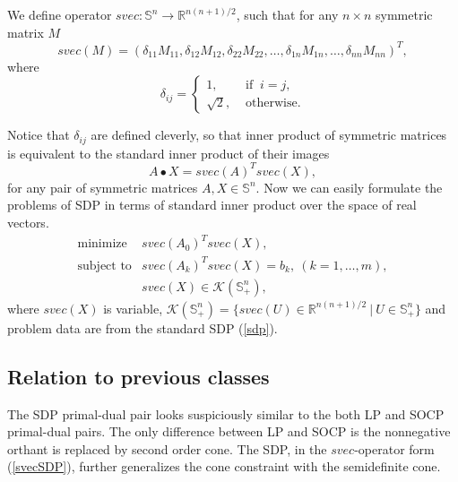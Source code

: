\documentclass[12pt]{book}
\theoremstyle{definition}
\begin{document}
 \label{svec}
We define operator $svec: \mathbb{S}^n \rightarrow \mathbb{R}^{n(n+1)/2}$, such that for any $n\times n$ symmetric matrix $M$
\begin{equation*}
	svec(M) = ( \delta_{11}M_{11},\delta_{12}M_{12},\delta_{22}M_{22},\dots ,\delta_{1n}M_{1n},\dots ,\delta_{nn}M_{nn})^T,
\end{equation*}
where
\begin{equation*}
	\delta_{ij}= \left\lbrace 
	\begin{array}{ll} 
		1, &\mbox{ if }\ i=j, \\ 
		\sqrt{2}, &\mbox{ otherwise.} 
	\end{array} \right.
\end{equation*}

Notice that $\delta_{ij}$ are defined cleverly, so that inner product of symmetric matrices is equivalent to the standard inner product of their images
\begin{equation*}
A\bullet X= svec(A)^Tsvec(X), 
\end{equation*}
for any pair of symmetric matrices $A,X\in \mathbb{S}^n.$  Now we can easily formulate the problems of SDP in terms of standard inner product over the space of real vectors. 
\begin{equation}
\label{svecSDP}
\begin{array}{ll}
\mbox{minimize} & svec(A_0)^T svec(X),\\
\mbox{subject to}& svec(A_k)^T svec(X)  = b_k, \ (k = 1,\dots ,m), \\
& svec(X) \in \mathcal{K}(\mathbb{S}^n_+),
\end{array}
\end{equation}
where $svec(X)$ is variable,  $\mathcal{K}(\mathbb{S}^n_+) = \{svec(U)\in \mathbb{R}^{n(n+1)/2}\ |\ U\in \mathbb{S}^n_+\}$ 
and problem data are from the standard SDP (\ref{sdp}).


\subsection{Relation to previous classes}
The  SDP primal-dual pair looks suspiciously similar to the both LP and SOCP primal-dual pairs. 
The only difference between LP and SOCP is the nonnegative orthant is replaced by second order cone. 
The SDP, in the $svec$-operator form (\ref{svecSDP}), further generalizes the cone constraint with the semidefinite cone.
\end{document}
